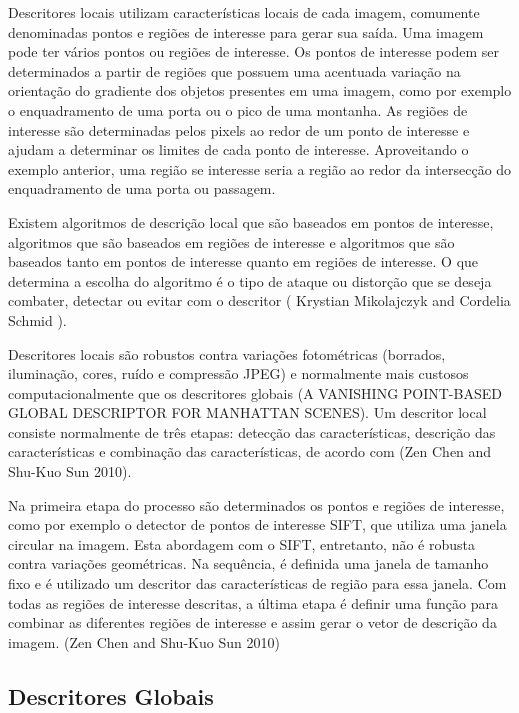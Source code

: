 Descritores locais utilizam características locais de cada imagem, comumente denominadas pontos e regiões de interesse para gerar sua saída. Uma imagem pode ter vários pontos ou regiões de interesse. Os pontos de interesse podem ser determinados a partir de regiões que possuem uma acentuada variação na orientação do gradiente dos objetos presentes em uma imagem, como por exemplo o enquadramento de uma porta ou o pico de uma montanha. As regiões de interesse são determinadas pelos pixels ao redor de um ponto de interesse e ajudam a determinar os limites de cada ponto de interesse. Aproveitando o exemplo anterior, uma região se interesse seria a região ao redor da intersecção do enquadramento de uma porta ou passagem.

Existem algoritmos de descrição local que são baseados em pontos de interesse, algoritmos que são baseados em regiões de interesse e algoritmos que são baseados tanto em pontos de interesse quanto em regiões de interesse. O que determina a escolha do algoritmo é o tipo de ataque ou distorção que se deseja combater, detectar ou evitar com o descritor ( Krystian Mikolajczyk and Cordelia Schmid ). 

Descritores locais são robustos contra variações fotométricas (borrados, iluminação, cores, ruído e compressão JPEG) e normalmente mais custosos computacionalmente que os descritores globais (A VANISHING POINT-BASED GLOBAL DESCRIPTOR FOR MANHATTAN SCENES). Um descritor local consiste normalmente de três etapas: detecção das características, descrição das características e combinação das características, de acordo com (Zen Chen and Shu-Kuo Sun 2010).

Na primeira etapa do processo são determinados os pontos e regiões de interesse, como por exemplo o detector de pontos de interesse SIFT, que utiliza uma janela circular na imagem. Esta abordagem com o SIFT, entretanto, não é robusta contra variações geométricas. Na sequência, é definida uma janela de tamanho fixo e é utilizado um descritor das características de região para essa janela. Com todas as regiões de interesse descritas, a última etapa é definir uma função para combinar as diferentes regiões de interesse e assim gerar o vetor de descrição da imagem. (Zen Chen and Shu-Kuo Sun 2010) 


\subsection{Descritores Globais}
\label{descritores globais}

